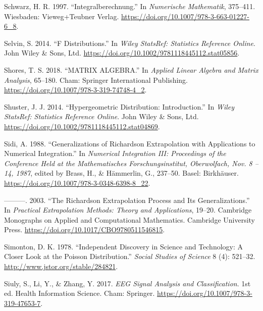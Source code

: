 \documentclass[
]{article}
\newlength{\cslhangindent}
\newlength{\cslentryspacingunit} %
\newenvironment{CSLReferences}[2] %
 {%
  \setlength{\parindent}{0pt}
  \ifodd #1
  \let\oldpar\par
  \def\par{\hangindent=\cslhangindent\oldpar}
  \fi
  \setlength{\parskip}{#2\cslentryspacingunit}
 }%
 {}
\begin{document}
\begin{CSLReferences}{1}{0}
\leavevmode{}%
Schwarz, H. R. 1997. {``Integralberechnung.''} In \emph{Numerische
Mathematik}, 375--411. Wiesbaden: Vieweg+Teubner Verlag.
\url{https://doi.org/10.1007/978-3-663-01227-6_8}.

\leavevmode{}%
Selvin, S. 2014. {``{F Distributions}.''} In \emph{Wiley StatsRef:
Statistics Reference Online}. John Wiley \& Sons, Ltd.
\url{https://doi.org/10.1002/9781118445112.stat05856}.

\leavevmode{}%
Shores, T. S. 2018. {``MATRIX ALGEBRA.''} In \emph{Applied Linear
Algebra and Matrix Analysis}, 65--180. Cham: Springer International
Publishing. \url{https://doi.org/10.1007/978-3-319-74748-4_2}.

\leavevmode{}%
Shuster, J. J. 2014. {``Hypergeometric Distribution: Introduction.''} In
\emph{Wiley StatsRef: Statistics Reference Online}. John Wiley \& Sons,
Ltd. \url{https://doi.org/10.1002/9781118445112.stat04869}.

\leavevmode{}%
Sidi, A. 1988. {``Generalizations of Richardson Extrapolation with
Applications to Numerical Integration.''} In \emph{Numerical Integration
III: Proceedings of the Conference Held at the Mathematisches
Forschungsinstitut, Oberwolfach, Nov. 8 -- 14, 1987}, edited by Brass,
H., \& Hämmerlin, G., 237--50. Basel: {Birkhäuser}.
\url{https://doi.org/10.1007/978-3-0348-6398-8_22}.

\leavevmode{}%
---------. 2003. {``The Richardson Extrapolation Process and Its
Generalizations.''} In \emph{Practical Extrapolation Methods: Theory and
Applications}, 19--20. Cambridge Monographs on Applied and Computational
Mathematics. Cambridge University Press.
\url{https://doi.org/10.1017/CBO9780511546815}.

\leavevmode{}%
Simonton, D. K. 1978. {``Independent Discovery in Science and
Technology: A Closer Look at the Poisson Distribution.''} \emph{Social
Studies of Science} 8 (4): 521--32.
\url{http://www.jstor.org/stable/284821}.

\leavevmode{}%
Siuly, S., Li, Y., \& Zhang, Y. 2017. \emph{EEG Signal Analysis and
Classification}. 1st ed. Health Information Science. Cham: Springer.
\url{https://doi.org/10.1007/978-3-319-47653-7}.


\end{CSLReferences}
\end{document}
